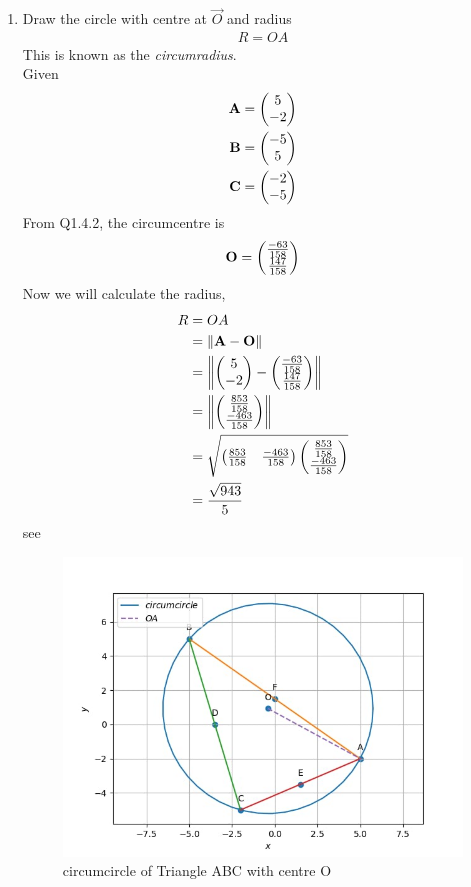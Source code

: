 \documentclass[11pt]{book}
\begin{document}
\begin{enumerate}[label=\thesection.\arabic*.,ref=\thesection.\theenumi]
\item Draw the circle with centre at $\vec{O}$ and radius 
\begin{align}
R = OA
\end{align}
This is known as the {\em circumradius}. \\
\solution
Given
\begin{align}
\mathbf{A} &= \begin{pmatrix}5\\-2\end{pmatrix}\\
\mathbf{B} &= \begin{pmatrix}-5\\5\end{pmatrix}\\
\mathbf{C} &= \begin{pmatrix}-2\\-5\end{pmatrix}
\end{align}
From Q1.4.2, the circumcentre is
\begin{align}
\mathbf{O} = \begin{pmatrix}\frac{-63}{158}\\ \frac{147}{158}\end{pmatrix}
\end{align}
Now we will calculate the radius,
\begin{align}
      R &= OA\\
        &= \left\lVert\mathbf{A} - \mathbf{O}\right\rVert\\
        &= \left\lVert\begin{pmatrix}5\\-2\end{pmatrix} - \begin{pmatrix}\frac{-63}{158}\\ \frac{147}{158}\end{pmatrix}\right\rVert\\
        &= \left\lVert\begin{pmatrix}\frac{853}{158}\\ \frac{-463}{158}\end{pmatrix}\right\rVert\\
        &=\sqrt{\begin{pmatrix}\frac{853}{158} & \frac{-463}{158}\end{pmatrix}\begin{pmatrix}\frac{853}{158} \\ \frac{-463}{158}\end{pmatrix}} \\
        &= \frac{\sqrt{943}}{5}
\end{align}
see 
\begin{figure}[H]
\centering
\includegraphics[width=\columnwidth]{figs/fouth_1.jpg}
\caption{circumcircle of Triangle ABC with centre O}
\label{fig:circumcircle with centre O}	
\end{figure}


\end{enumerate}
\end{document}
